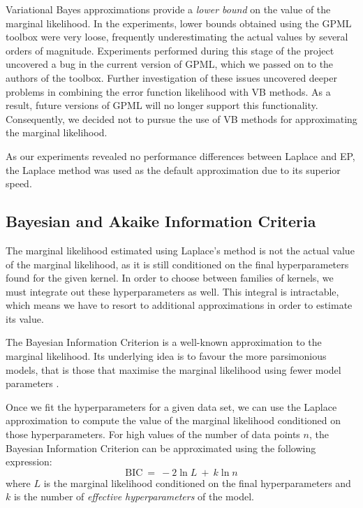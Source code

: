 \documentclass[a4paper,12pt ]{report}
\begin{document}
Variational Bayes approximations provide a \emph{lower bound} on the value of the marginal likelihood. In the experiments, lower bounds obtained using the GPML toolbox were very loose, frequently underestimating the actual values by several orders of magnitude. Experiments performed during this stage of the project uncovered a bug in the current version of GPML, which we passed on to the authors of the toolbox. Further investigation of these issues uncovered deeper problems in combining the error function likelihood with VB methods. As a result, future versions of GPML will no longer support this functionality. Consequently, we decided not to pursue the use of VB methods for approximating the marginal likelihood.

As our experiments revealed no performance differences between Laplace and EP, the Laplace method was used as the default approximation due to its superior speed.


\subsection{Bayesian and Akaike Information Criteria}

The marginal likelihood estimated using Laplace's method is not the actual value of the marginal likelihood, as it is still conditioned on the final hyperparameters found for the given kernel. In order to choose between families of kernels, we must integrate out these hyperparameters as well. This integral is intractable, which means we have to resort to additional approximations in order to estimate its value. %

The Bayesian Information Criterion is a well-known approximation to the marginal likelihood. Its underlying idea is to favour the more parsimonious models, that is those that maximise the marginal likelihood using fewer model parameters \cite{schwarz1978estimating}.


Once we fit the hyperparameters for a given data set, we can use the Laplace approximation to compute the value of the marginal likelihood conditioned on those hyperparameters. For high values of the number of data points $n$, the Bayesian Information Criterion can be approximated using the following expression:
\begin{equation*} \mathrm{BIC} ~=~  - 2 \ln L ~+~  k  \ln n  \end{equation*}
where $L$ is the marginal likelihood conditioned on the final hyperparameters and $k$ is the number of \emph{effective hyperparameters} of the model. %
\end{document}

